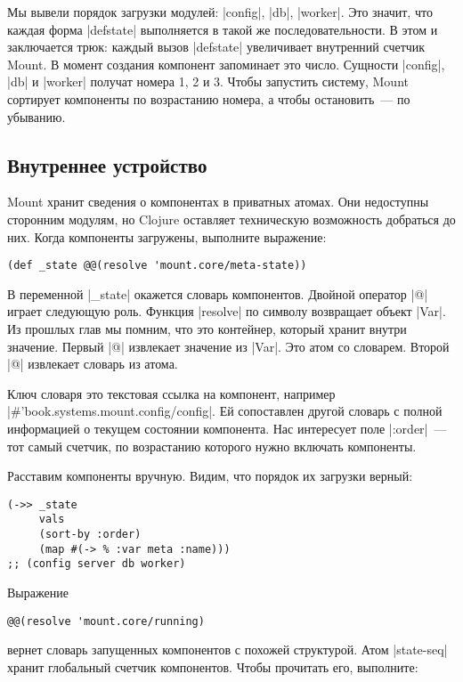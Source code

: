 Мы вывели порядок загрузки модулей: \spverb|config|, \spverb|db|, \spverb|worker|. Это значит, что
каждая форма \spverb|defstate| выполняется в такой же последовательности. В этом и
заключается трюк: каждый вызов \spverb|defstate| увеличивает внутренний счетчик
Mount. В момент создания компонент запоминает это число. Сущности \spverb|config|, \spverb|db|
и \spverb|worker| получат номера 1, 2 и 3. Чтобы запустить систему, Mount сортирует
компоненты по возрастанию номера, а чтобы остановить~--- по убыванию.

\subsection{Внутреннее устройство}

Mount хранит сведения о компонентах в приватных атомах. Они недоступны сторонним
модулям, но Clojure оставляет техническую возможность добраться до них. Когда
компоненты загружены, выполните выражение:

\begin{verbatim}
(def _state @@(resolve 'mount.core/meta-state))
\end{verbatim}

В переменной \spverb|_state| окажется словарь компонентов. Двойной оператор \spverb|@| играет
следующую роль. Функция \spverb|resolve| по символу возвращает объект \spverb|Var|. Из прошлых
глав мы помним, что это контейнер, который хранит внутри значение. Первый \spverb|@|
извлекает значение из \spverb|Var|. Это атом со словарем. Второй \spverb|@| извлекает словарь
из атома.

Ключ словаря это текстовая ссылка на компонент, например
\spverb|#'book.systems.mount.config/config|. Ей сопоставлен другой словарь с полной
информацией о текущем состоянии компонента. Нас интересует поле \spverb|:order|~--- тот
самый счетчик, по возрастанию которого нужно включать компоненты.

Расставим компоненты вручную. Видим, что порядок их загрузки верный:

\begin{verbatim}
(->> _state
     vals
     (sort-by :order)
     (map #(-> % :var meta :name)))
;; (config server db worker)
\end{verbatim}

Выражение

\begin{verbatim}
@@(resolve 'mount.core/running)
\end{verbatim}

вернет словарь запущенных компонентов с похожей структурой. Атом \spverb|state-seq|
хранит глобальный счетчик компонентов. Чтобы прочитать его, выполните:

